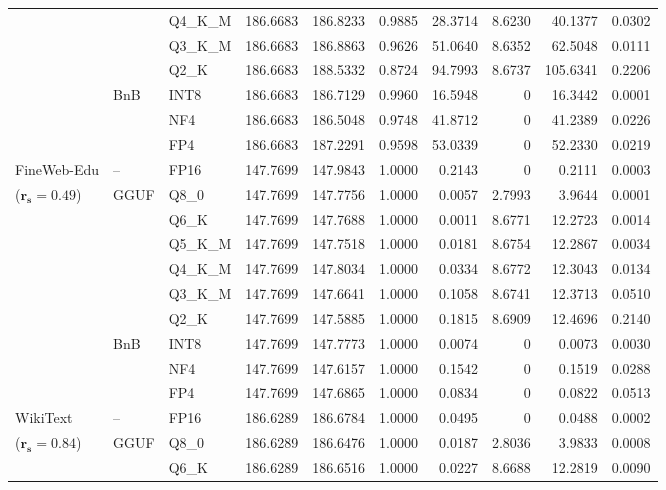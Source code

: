 \begin{table}[t]
{\begin{tabular}{ll l rrrrrrr}
 &  & Q4\_K\_M & 186.6683 & 186.8233 & 0.9885 & 28.3714 & 8.6230 & 40.1377 & 0.0302 \\
 &  & Q3\_K\_M & 186.6683 & 186.8863 & 0.9626 & 51.0640 & 8.6352 & 62.5048 & 0.0111 \\
 &  & Q2\_K & 186.6683 & 188.5332 & \cellcolor{red!18} 0.8724 & \cellcolor{red!18} 94.7993 & 8.6737 & \cellcolor{red!18} 105.6341 & \cellcolor{red!18} 0.2206 \\
 & BnB & INT8 & 186.6683 & 186.7129 & 0.9960 & 16.5948 & \cellcolor{cyan!12} $0$ & 16.3442 & 0.0001 \\
 &  & NF4 & 186.6683 & 186.5048 & 0.9748 & 41.8712 & \cellcolor{cyan!12} $0$ & 41.2389 & 0.0226 \\
 &  & FP4 & 186.6683 & 187.2291 & 0.9598 & 53.0339 & \cellcolor{cyan!12} $0$ & 52.2330 & 0.0219 \\
\midrule
FineWeb-Edu & -- & FP16 & 147.7699 & 147.9843 & 1.0000 & 0.2143 & \cellcolor{cyan!12} $0$ & 0.2111 & 0.0003 \\
{\small ($\mathbf{r_s{=}0.49}$)} & GGUF & Q8\_0 & 147.7699 & 147.7756 & 1.0000 & 0.0057 & 2.7993 & 3.9644 & 0.0001 \\
 &  & Q6\_K & 147.7699 & 147.7688 & 1.0000 & 0.0011 & 8.6771 & 12.2723 & 0.0014 \\
 &  & Q5\_K\_M & 147.7699 & 147.7518 & 1.0000 & 0.0181 & 8.6754 & 12.2867 & 0.0034 \\
 &  & Q4\_K\_M & 147.7699 & 147.8034 & 1.0000 & 0.0334 & 8.6772 & 12.3043 & 0.0134 \\
 &  & Q3\_K\_M & 147.7699 & 147.6641 & 1.0000 & 0.1058 & 8.6741 & 12.3713 & 0.0510 \\
 &  & Q2\_K & 147.7699 & 147.5885 & 1.0000 & 0.1815 & 8.6909 & 12.4696 & 0.2140 \\
 & BnB & INT8 & 147.7699 & 147.7773 & 1.0000 & 0.0074 & \cellcolor{cyan!12} $0$ & 0.0073 & 0.0030 \\
 &  & NF4 & 147.7699 & 147.6157 & 1.0000 & 0.1542 & \cellcolor{cyan!12} $0$ & 0.1519 & 0.0288 \\
 &  & FP4 & 147.7699 & 147.6865 & 1.0000 & 0.0834 & \cellcolor{cyan!12} $0$ & 0.0822 & 0.0513 \\
\midrule
WikiText & -- & FP16 & 186.6289 & 186.6784 & 1.0000 & 0.0495 & \cellcolor{cyan!12} $0$ & 0.0488 & 0.0002 \\
{\small ($\mathbf{r_s{=}0.84}$)} & GGUF & Q8\_0 & 186.6289 & 186.6476 & 1.0000 & 0.0187 & 2.8036 & 3.9833 & 0.0008 \\
 &  & Q6\_K & 186.6289 & 186.6516 & 1.0000 & 0.0227 & 8.6688 & 12.2819 & 0.0090 \\

\end{tabular}}
\end{table}
